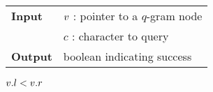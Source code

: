 \begin{figure*}[t]
\begin{center}
\begin{minipage}[t]{.6\textwidth}
\begin{algorithm}[H]
\begin{tabular}{ll}
\textbf{Input}  & $v$ : pointer to a $q$-gram node\\
				& $c$ : character to query\\
\textbf{Output} & boolean indicating success\\
\end{tabular}
\begin{algorithmic}[1]
	\State \Return \False
\EndIf
{}
\State \Return $v.l < v.r$
\end{algorithmic}
\label{alg:qgram-godownc}
\end{algorithm}
\end{minipage}
\end{center}
\end{figure*}



